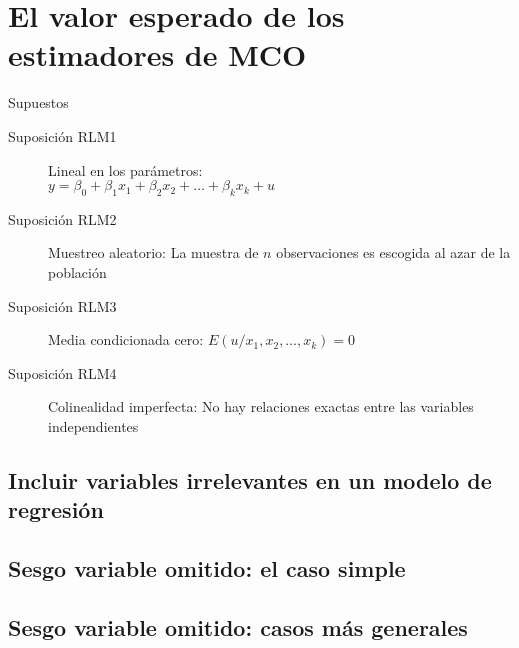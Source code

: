 \section{El valor esperado de los estimadores de MCO}
\begin{frame}{Supuestos}
	\begin{description}
		\item[Suposición RLM1] Lineal en los parámetros:\\ 			$y=\beta_{0}+\beta_{1}x_{1}+\beta_{2}x_{2}+ \ldots +\beta_{k}x_{k}+u$
		\item[Suposición RLM2] Muestreo aleatorio: La muestra de $n$ observaciones es escogida al azar de la población
		\item[Suposición RLM3] Media condicionada cero: $E(u/x_{1},x_{2}, \ldots ,x_{k})=0$
		\item[Suposición RLM4] Colinealidad imperfecta: No hay relaciones exactas entre las variables independientes
	\end{description}
\end{frame}
\subsection{Incluir variables irrelevantes en un modelo de regresión}
\subsection{Sesgo variable omitido: el caso simple}
\subsection{Sesgo variable omitido: casos más generales}